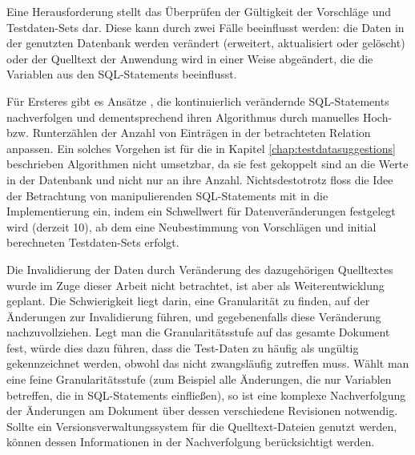 Eine Herausforderung stellt das Überprüfen der Gültigkeit der Vorschläge und Testdaten-Sets dar.
Diese kann durch zwei Fälle beeinflusst werden: die Daten in der genutzten Datenbank werden verändert (erweitert, aktualisiert oder gelöscht) oder der Quelltext der Anwendung wird in einer Weise abgeändert, die die Variablen aus den SQL-Statements beeinflusst.

Für Ersteres gibt es Ansätze \cite{DBLP:conf/dasfaa/HarangsriSN97}, die kontinuierlich verändernde SQL-Statements nachverfolgen und dementsprechend ihren Algorithmus durch manuelles Hoch- bzw. Runterzählen der Anzahl von Einträgen in der betrachteten Relation anpassen.
Ein solches Vorgehen ist für die in Kapitel \ref{chap:testdatasuggestions} beschrieben Algorithmen nicht umsetzbar, da sie fest gekoppelt sind an die Werte in der Datenbank und nicht nur an ihre Anzahl.
Nichtsdestotrotz floss die Idee der Betrachtung von manipulierenden SQL-Statements mit in die Implementierung ein, indem ein Schwellwert für Datenveränderungen festgelegt wird (derzeit 10), ab dem eine Neubestimmung von Vorschlägen und initial berechneten Testdaten-Sets erfolgt.

Die Invalidierung der Daten durch Veränderung des dazugehörigen Quelltextes wurde im Zuge dieser Arbeit nicht betrachtet, ist aber als Weiterentwicklung geplant.
Die Schwierigkeit liegt darin, eine Granularität zu finden, auf der Änderungen zur Invalidierung führen, und gegebenenfalls diese Veränderung nachzuvollziehen.
Legt man die Granularitätsstufe auf das gesamte Dokument fest, würde dies dazu führen, dass die Test-Daten zu häufig als ungültig gekennzeichnet werden, obwohl das nicht zwangsläufig zutreffen muss.
Wählt man eine feine Granularitätsstufe (zum Beispiel alle Änderungen, die nur Variablen betreffen, die in SQL-Statements einfließen), so ist eine komplexe Nachverfolgung der Änderungen am Dokument über dessen verschiedene Revisionen notwendig.
Sollte ein Versionsverwaltungssystem für die Quelltext-Dateien genutzt werden, können dessen Informationen in der Nachverfolgung berücksichtigt werden.

